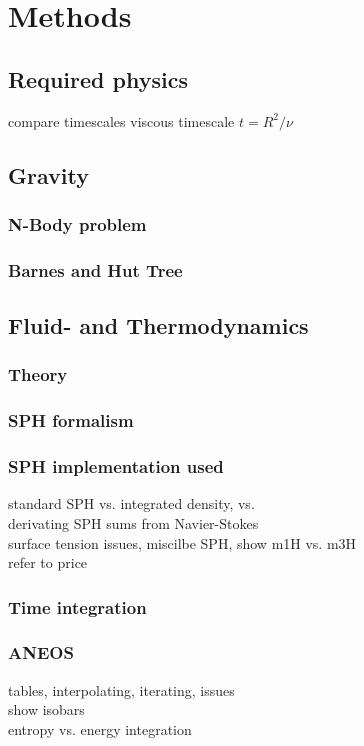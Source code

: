 \graphicspath{{./02figs/}}

\chapter{Methods}
%

\section{Required physics}
compare timescales
viscous timescale $t = R^2 / \nu$
\SSC 
\textsf{\SSC}

\section{Gravity}
\subsection{N-Body problem}
\subsection{Barnes and Hut Tree}

\section{Fluid- and Thermodynamics}
\subsection{Theory}
\subsection{SPH formalism}


\subsection{SPH implementation used}
standard SPH vs. integrated density, vs.\\
derivating SPH sums from Navier-Stokes\\
surface tension issues, miscilbe SPH, show m1H vs. m3H\\
refer to price
\subsection{Time integration}


\subsection{ANEOS}
tables, interpolating, iterating, issues\\
show isobars\\
entropy vs. energy integration\\


